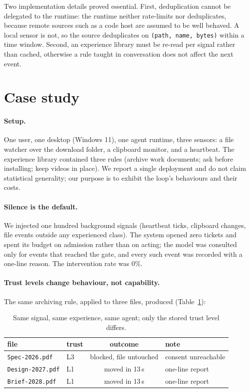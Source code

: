 \documentclass[10pt,a4paper]{article}
\begin{document}
Two implementation details proved essential. First, deduplication cannot be
delegated to the runtime: the runtime neither rate-limits nor deduplicates,
because remote sources such as a code host are assumed to be well behaved. A
local sensor is not, so the source deduplicates on \texttt{(path, name,
bytes)} within a time window. Second, an experience library must be re-read
per signal rather than cached, otherwise a rule taught in conversation does
not affect the next event.

\section{Case study}
\label{sec:case}

\paragraph{Setup.}
One user, one desktop (Windows 11), one agent runtime, three sensors: a file
watcher over the download folder, a clipboard monitor, and a heartbeat. The
experience library contained three rules (archive work documents; ask before
installing; keep videos in place). We report a single deployment and do not
claim statistical generality; our purpose is to exhibit the loop's behaviours
and their costs.

\paragraph{Silence is the default.}
We injected one hundred background signals (heartbeat ticks, clipboard
changes, file events outside any experienced class). The system opened zero
tickets and spent its budget on admission rather than on acting; the model
was consulted only for events that reached the gate, and every such event was
recorded with a one-line reason. The intervention rate was 0\%.

\paragraph{Trust levels change behaviour, not capability.}
The same archiving rule, applied to three files, produced (Table~\ref{tab:trust}):

\begin{table}[h]
\centering\small
\begin{tabular}{@{}llcl@{}}
\toprule
file & trust & outcome & note \\
\midrule
\texttt{Spec-2026.pdf} & L3 & blocked, file untouched & consent unreachable \\
\texttt{Design-2027.pdf} & L1 & moved in 13\,s & one-line report \\
\texttt{Brief-2028.pdf} & L1 & moved in 13\,s & one-line report \\
\bottomrule
\end{tabular}
\caption{Same signal, same experience, same agent; only the stored trust
level differs.}
\label{tab:trust}
\end{table}
\end{document}
